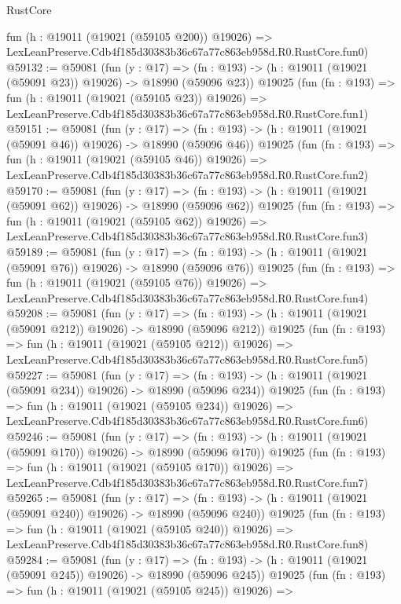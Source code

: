 \begin{lexlean}{RustCore}
\begin{coremodule}
    fun (h : @19011 (@19021 (@59105 @200)) @19026) =>
    LexLeanPreserve.Cdb4f185d30383b36c67a77c863eb958d.R0.RustCore.fun0)
@59132 := @59081
    (fun (y : @17) =>
    (fn : @193) -> (h : @19011 (@19021 (@59091 @23)) @19026) -> @18990 (@59096 @23))
    @19025
    (fun (fn : @193) =>
    fun (h : @19011 (@19021 (@59105 @23)) @19026) =>
    LexLeanPreserve.Cdb4f185d30383b36c67a77c863eb958d.R0.RustCore.fun1)
@59151 := @59081
    (fun (y : @17) =>
    (fn : @193) -> (h : @19011 (@19021 (@59091 @46)) @19026) -> @18990 (@59096 @46))
    @19025
    (fun (fn : @193) =>
    fun (h : @19011 (@19021 (@59105 @46)) @19026) =>
    LexLeanPreserve.Cdb4f185d30383b36c67a77c863eb958d.R0.RustCore.fun2)
@59170 := @59081
    (fun (y : @17) =>
    (fn : @193) -> (h : @19011 (@19021 (@59091 @62)) @19026) -> @18990 (@59096 @62))
    @19025
    (fun (fn : @193) =>
    fun (h : @19011 (@19021 (@59105 @62)) @19026) =>
    LexLeanPreserve.Cdb4f185d30383b36c67a77c863eb958d.R0.RustCore.fun3)
@59189 := @59081
    (fun (y : @17) =>
    (fn : @193) -> (h : @19011 (@19021 (@59091 @76)) @19026) -> @18990 (@59096 @76))
    @19025
    (fun (fn : @193) =>
    fun (h : @19011 (@19021 (@59105 @76)) @19026) =>
    LexLeanPreserve.Cdb4f185d30383b36c67a77c863eb958d.R0.RustCore.fun4)
@59208 := @59081
    (fun (y : @17) =>
    (fn : @193) -> (h : @19011 (@19021 (@59091 @212)) @19026) -> @18990 (@59096 @212))
    @19025
    (fun (fn : @193) =>
    fun (h : @19011 (@19021 (@59105 @212)) @19026) =>
    LexLeanPreserve.Cdb4f185d30383b36c67a77c863eb958d.R0.RustCore.fun5)
@59227 := @59081
    (fun (y : @17) =>
    (fn : @193) -> (h : @19011 (@19021 (@59091 @234)) @19026) -> @18990 (@59096 @234))
    @19025
    (fun (fn : @193) =>
    fun (h : @19011 (@19021 (@59105 @234)) @19026) =>
    LexLeanPreserve.Cdb4f185d30383b36c67a77c863eb958d.R0.RustCore.fun6)
@59246 := @59081
    (fun (y : @17) =>
    (fn : @193) -> (h : @19011 (@19021 (@59091 @170)) @19026) -> @18990 (@59096 @170))
    @19025
    (fun (fn : @193) =>
    fun (h : @19011 (@19021 (@59105 @170)) @19026) =>
    LexLeanPreserve.Cdb4f185d30383b36c67a77c863eb958d.R0.RustCore.fun7)
@59265 := @59081
    (fun (y : @17) =>
    (fn : @193) -> (h : @19011 (@19021 (@59091 @240)) @19026) -> @18990 (@59096 @240))
    @19025
    (fun (fn : @193) =>
    fun (h : @19011 (@19021 (@59105 @240)) @19026) =>
    LexLeanPreserve.Cdb4f185d30383b36c67a77c863eb958d.R0.RustCore.fun8)
@59284 := @59081
    (fun (y : @17) =>
    (fn : @193) -> (h : @19011 (@19021 (@59091 @245)) @19026) -> @18990 (@59096 @245))
    @19025
    (fun (fn : @193) =>
    fun (h : @19011 (@19021 (@59105 @245)) @19026) =>

\end{coremodule}
\end{lexlean}
